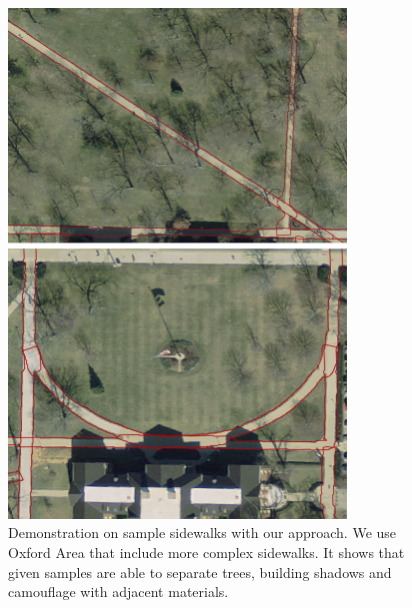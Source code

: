 \begin{figure}[H]
    \centering
    \includegraphics[width=0.8\textwidth]{Figures/Oxford_success_complex.png}
    \caption[Sample Sidewalk 3]{Demonstration on sample sidewalks with our approach. We use Oxford Area that include more complex sidewalks. It shows that given samples are able to separate trees, building shadows and camouflage with adjacent materials.}
    \label{fig:oxford1}
\end{figure}

